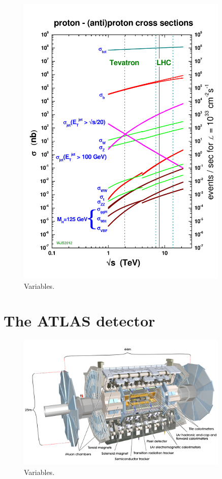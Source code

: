 \begin{figure}[tp]
  \centering
  \includegraphics[width=0.90\textwidth]{figures/lhc-atlas/crosssections2012_v5}
  \caption{Variables.}
  \label{fig:lhc-stirling}
\end{figure}

\section{The ATLAS detector}
\label{sec:atlas}

\begin{figure}[tp]
  \centering
  \includegraphics[width=0.90\textwidth]{figures/lhc-atlas/atlas-0803012_01.jpg}
  \caption{Variables.}
  \label{fig:atlas-cartoon}
\end{figure}

